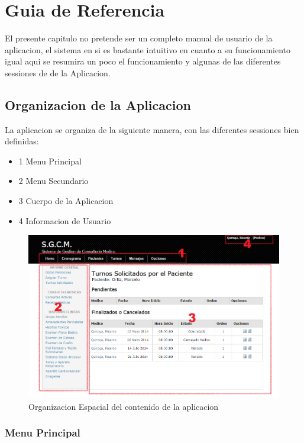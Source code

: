 \chapter{Guia de Referencia}

El presente capitulo no pretende ser un completo manual de usuario de la aplicacion, 
el sistema en si es bastante intuitivo en cuanto a su funcionamiento igual aqui
se resumira un poco el funcionamiento y algunas de las diferentes sessiones de de 
la Aplicacion.

\section{Organizacion de la Aplicacion}

La aplicacion se organiza de la siguiente manera, con las diferentes sessiones
bien definidas:

\begin{itemize}
    \item 1 Menu Principal
    \item 2 Menu Secundario
    \item 3 Cuerpo de la Aplicacion
    \item 4 Informacion de Usuario
\end{itemize}

\begin{figure}[H]
    \centering
    \includegraphics[scale=0.5]{resourse/organizacion.png}
    \caption{Organizacion Espacial del contenido de la aplicacion}
    \label{fig:61}
\end{figure}


\subsection{Menu Principal}

